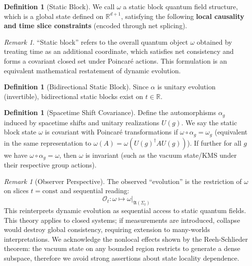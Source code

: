 \documentclass[11pt]{article}
\theoremstyle{definition}
\newtheorem{definition}[theorem]{Definition}
\theoremstyle{remark}
\newtheorem{remark}[theorem]{Remark}
\begin{document}
\begin{definition}[Static Block]\label{def:staticblock}
We call \( \omega \) a static block quantum field structure, which is a global state defined on \( \mathbb{R}^{d+1} \), satisfying the following \textbf{local causality and time slice constraints} (encoded through net splicing).
\end{definition}

\begin{remark}
``Static block'' refers to the overall quantum object \( \omega \) obtained by treating time as an additional coordinate, which satisfies net consistency and forms a covariant closed set under Poincaré actions. This formulation is an equivalent mathematical restatement of dynamic evolution.
\end{remark}

\begin{definition}[Bidirectional Static Block]\label{def:bidir}
Since \( \alpha \) is unitary evolution (invertible), bidirectional static blocks exist on \( t \in \mathbb{R} \).
\end{definition}

\begin{definition}[Spacetime Shift Covariance]\label{def:covariance}
Define the automorphisms \( \alpha_g \) induced by spacetime shifts and unitary realizations \( U(g) \). We say the static block state \( \omega \) is covariant with Poincaré transformations if \( \omega \circ \alpha_g = \omega_g \) (equivalent in the same representation to \( \omega(A)=\omega(U(g)^\dagger A U(g)) \)). If further for all \( g \) we have \( \omega\circ\alpha_g=\omega \), then \( \omega \) is invariant (such as the vacuum state/KMS under their respective group actions).
\end{definition}

\begin{remark}[Observer Perspective]\label{rem:3.3}
The observed ``evolution'' is the restriction of \( \omega \) on slices \( t = \mathrm{const} \) and sequential reading:
\[
\mathcal{O}_t: \omega \mapsto \omega|_{\mathfrak{A}(\Sigma_t)}
\]
This reinterprets dynamic evolution as sequential access to static quantum fields. This theory applies to closed systems; if measurements are introduced, collapse would destroy global consistency, requiring extension to many-worlds interpretations. We acknowledge the nonlocal effects shown by the Reeh-Schlieder theorem: the vacuum state on any bounded region restricts to generate a dense subspace, therefore we avoid strong assertions about state locality dependence.
\end{remark}
\end{document}
